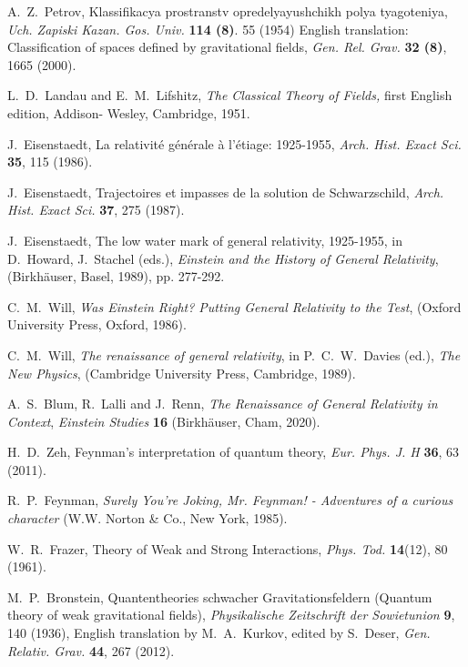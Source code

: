 \documentclass{ws-procs961x669}            %
\begin{document}
\begin{thebibliography}{99}
A.~Z.~Petrov, Klassifikacya prostranstv opredelyayushchikh polya
tyagoteniya, {\em Uch. Zapiski Kazan. Gos. Univ.} {\bf 114 (8)}.
55 (1954) English translation: Classification of spaces defined by
gravitational fields, {\em Gen. Rel. Grav.} {\bf 32 (8)}, 1665
(2000).


L.~D.~Landau and E.~M.~Lifshitz, \emph{The Classical Theory of
Fields,} first English edition, Addison- Wesley, Cambridge, 1951.

J.~Eisenstaedt, La relativit\'e g\'en\'erale \`a l'\'etiage:
1925-1955, {\it Arch. Hist. Exact Sci.} \textbf{35}, 115 (1986).

J.~Eisenstaedt, Trajectoires et impasses de la solution de
Schwarzschild, {\it Arch. Hist. Exact Sci.} \textbf{37}, 275
(1987).

J.~Eisenstaedt, The low water mark of general relativity,
1925-1955, in D.~Howard, J.~Stachel (eds.), \emph{Einstein and the
History of General Relativity}, (Birkh\"{a}user, Basel, 1989), pp.
277-292.

C.~M.~Will,    {\it Was Einstein Right? Putting General Relativity
to the Test}, (Oxford University Press, Oxford, 1986).

C.~M.~Will, \emph{The renaissance of general relativity}, in
P.~C.~W.~Davies (ed.), \emph{The New Physics}, (Cambridge
University Press, Cambridge, 1989).

A.~S.~Blum, R.~Lalli and J.~Renn, {\it The Renaissance of General
Relativity in Context}, {\it Einstein Studies} \textbf{16}
(Birkh\"{a}user, Cham, 2020).

H.~D.~Zeh, Feynman's interpretation of quantum theory, {\it Eur.
Phys. J. H}  {\bf 36}, 63 (2011).

R.~P.~Feynman, {\it Surely You're Joking, Mr. Feynman! -
Adventures of a curious character} (W.W. Norton \& Co., New York,
1985).

W.~R.~Frazer, Theory of Weak and Strong Interactions, {\it Phys.
Tod.} {\bf 14}(12), 80 (1961).

M.~P.~Bronstein, Quantentheories schwacher Gravitationsfeldern
(Quantum theory of weak gravitational fields), {\it Physikalische
Zeitschrift der Sowietunion} \textbf{9}, 140 (1936), English
translation by M.~A.~Kurkov, edited by S.~Deser, {\it Gen.
Relativ. Grav.} \textbf{44}, 267 (2012).


\end{thebibliography}
\end{document}
